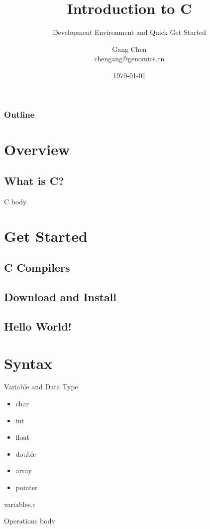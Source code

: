 \documentclass[UTF8]{beamer}
\title{Introduction to C}
\subtitle{Development Environment and Quick Get Started}
\author{Gang Chen\\ chengang@genomics.cn}
\date{\today}
\begin{document}
\begin{frame}
\titlepage
\end{frame}
\begin{frame}[t]\frametitle{Outline}
\tableofcontents[hideallsubsections]
\end{frame}

\section{Overview}
\subsection{What is C?}
\begin{frame}[t]{C}
    body
\end{frame}


\section{Get Started}
\subsection{C Compilers}
\subsection{Download and Install}
\subsection{Hello World!}

\section{Syntax}
\begin{frame}[t]{Variable and Data Type}
    \begin{itemize}
        \item char
        \item int
        \item float
        \item double
        \item array
        \item pointer
    \end{itemize}
    variables.c
\end{frame}

\begin{frame}[t]{Operations}
    body
\end{frame}
\end{document}
